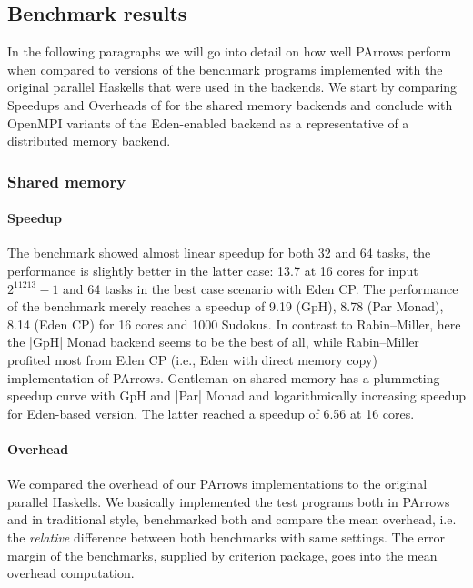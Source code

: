 
\subsection{Benchmark results}\label{sec:benchmarkResults}

In the following paragraphs we will go into detail on how well PArrows perform when compared to versions of the benchmark programs implemented with the original parallel Haskells that were used in the backends. We start by comparing Speedups and Overheads of for the shared memory backends and conclude with OpenMPI variants of the Eden-enabled backend as a representative of a distributed memory backend.


\subsubsection{Shared memory}

\paragraph{Speedup}
The \rmtest benchmark showed almost linear speedup for both 32 and 64 tasks, the performance is slightly better in the latter case: 13.7 at 16 cores for input $2^{11213}-1$ and 64 tasks in the best case scenario with Eden CP. The performance of the \sudokutest benchmark merely reaches a speedup of 9.19 (GpH), 8.78 (Par Monad), 8.14 (Eden CP) for 16 cores and 1000 Sudokus. In contrast to Rabin–Miller, here the |GpH| Monad backend seems to be the best of all, while Rabin–Miller profited most from Eden CP (i.e., Eden with direct memory copy) implementation of PArrows. Gentleman on shared memory has a plummeting speedup curve with GpH and |Par| Monad and logarithmically increasing speedup for Eden-based version. The latter reached a speedup of 6.56 at 16 cores.


\paragraph{Overhead}
We compared the overhead of our PArrows implementations to the original parallel Haskells. We basically implemented the test programs both in PArrows and in traditional style, benchmarked both and compare the mean overhead, i.e. the \textit{relative} difference between both benchmarks with same settings. The error margin of the benchmarks, supplied by criterion package, goes into the mean overhead computation. 

